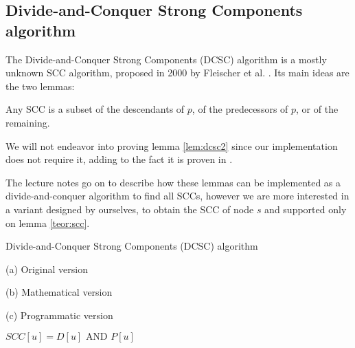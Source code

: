 \subsection[DCSC algorithm]{Divide-and-Conquer Strong Components algorithm} \label{algorithm-scc-dcsc}
The Divide-and-Conquer Strong Components (DCSC) algorithm is a mostly unknown SCC algorithm, proposed in 2000 by Fleischer et al. \cite{fleischer-dcsc}. Its main ideas are the two lemmas:
\begin{lemma} \label{lem:dcsc2}
    Any SCC is a subset of the descendants of $p$, of the predecessors of $p$, or of the remaining.
\end{lemma}
We will not endeavor into proving lemma \ref{lem:dcsc2} since our implementation does not require it, adding to the fact it is proven in \cite{fleischer-dcsc}.\par
The lecture notes go on to describe how these lemmas can be implemented as a divide-and-conquer algorithm to find all SCCs, however we are more interested in a variant designed by ourselves, to obtain the SCC of node $s$ and supported only on lemma \ref{teor:scc}.
\begin{algorithm}[H]
    \caption{Divide-and-Conquer Strong Components (DCSC) algorithm}
    \label{alg-dcsc}
    \begin{minipage}[t]{0.49\linewidth}
        (a) Original version
        \begin{algorithmic}[1]
                 
                 
                 
                \State {}
            \EndFunction
        \end{algorithmic}
    \end{minipage}
    \begin{minipage}[t]{0.49\linewidth}
        (b) Mathematical version
        \begin{algorithmic}[1]
                 
                 
                \State {}
            \EndFunction
        \end{algorithmic}
        (c) Programmatic version
        \begin{algorithmic}[1]
                 
                 
                 {$SCC[u] = D[u] \text{ AND } P[u]$}
                \EndFor
                \State {}
            \EndFunction
        \end{algorithmic}
    \end{minipage}
\end{algorithm}
